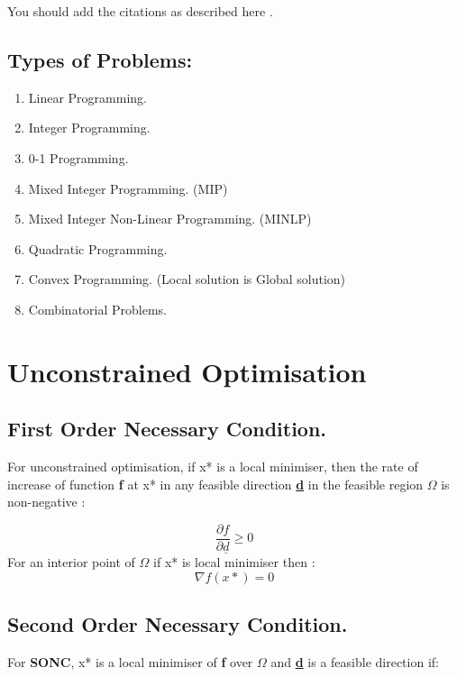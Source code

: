 \documentclass[12pt,a4paper,titlepage]{article}
\begin{document}
You should add the citations as described here \cite{sadd2009elasticity}.

\subsection{Types of Problems:}
\begin{enumerate}
    \item Linear Programming.
    \item Integer Programming.
    \item 0-1 Programming.
    \item Mixed Integer Programming. (MIP)
    \item Mixed Integer Non-Linear Programming. (MINLP)
    \item Quadratic Programming.
    \item Convex Programming. (Local solution is Global solution)
    \item Combinatorial Problems.
\end{enumerate}
%

\section{Unconstrained Optimisation}

\subsection{First Order Necessary Condition.}
For unconstrained optimisation, if x* is a local minimiser, then the rate of increase of function \textbf{f} at x* in any feasible direction \textbf{\underline{d}} in the feasible region $\Omega$ is non-negative :

\begin{equation}
    \dfrac{\partial f}{\partial\underline{d} } \geq 0 \label{eq1} 
\end{equation}
For an interior point of $\Omega$ if x* is local minimiser then :
\begin{equation}
    \nabla f (x*)=  0 \label{eq2} 
\end{equation}


\subsection{Second Order Necessary Condition.}
For \textbf{SONC}, x* is a local minimiser of \textbf{f} over $\Omega$ and \textbf{\underline{d}} is a feasible direction if:
\end{document}
